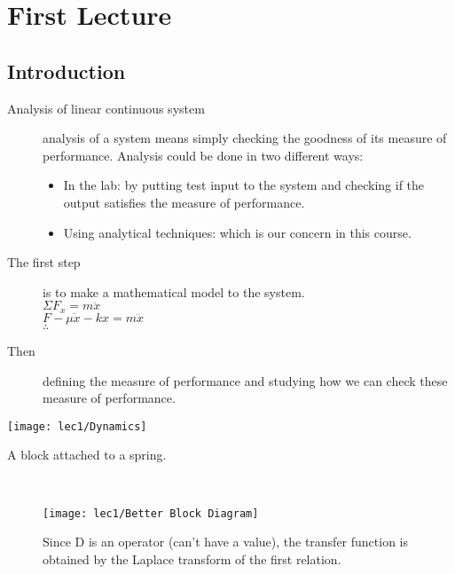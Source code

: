 \setchapterpreamble[u]{\margintoc}
\chapter{First Lecture}




\section{Introduction}

\begin{description}
	\item[Analysis of linear continuous system] analysis of a system means simply checking the goodness of its measure of performance.
Analysis could be done in two different ways:
\begin{itemize}
	\item In the lab: by putting test input to the system and checking if the output satisfies the measure of performance.
	\item Using analytical techniques: which is our concern in this course.
\end{itemize}
	\item[The first step] is to make a mathematical model to the system. \\[+1mm]
	$\Sigma F_x = m\ddot{x}$\\
	$F - \mu\dot{x} - kx = m\ddot{x}$\\
	$\therefore$
	\\[-2mm]
	\item[Then] defining the measure of performance and studying how we can check these measure of performance.
\end{description}

\begin{marginfigure}[-3cm]
		\texttt{[image: lec1/Dynamics]}
		\caption{A block attached to a spring.}
\end{marginfigure}

 \leavevmode\\[-1.6cm]
 \begin{figure}[hb]
		\raggedleft
		\texttt{[image: lec1/Better Block Diagram]}
		\caption{Since D is an operator (can't have a value),  the transfer function is obtained by the Laplace transform of the first relation.}
\end{figure}
\leavevmode\\[-1.4cm]

